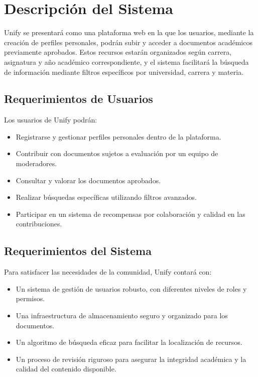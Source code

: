 \documentclass[10pt,twocolumn]{article}
\begin{document}
\section{Descripción del Sistema}
Unify se presentará como una plataforma web en la que los usuarios, mediante la creación de perfiles personales, podrán subir y acceder a documentos académicos previamente aprobados. Estos recursos estarán organizados según carrera, asignatura y año académico correspondiente, y el sistema facilitará la búsqueda de información mediante filtros específicos por universidad, carrera y materia.

\subsection{Requerimientos de Usuarios}
Los usuarios de Unify podrán:
\begin{itemize}
  \item Registrarse y gestionar perfiles personales dentro de la plataforma.
  \item Contribuir con documentos sujetos a evaluación por un equipo de moderadores.
  \item Consultar y valorar los documentos aprobados.
  \item Realizar búsquedas específicas utilizando filtros avanzados.
  \item Participar en un sistema de recompensas por colaboración y calidad en las contribuciones.
\end{itemize}

\subsection{Requerimientos del Sistema}
Para satisfacer las necesidades de la comunidad, Unify contará con:
\begin{itemize}
  \item Un sistema de gestión de usuarios robusto, con diferentes niveles de roles y permisos.
  \item Una infraestructura de almacenamiento seguro y organizado para los documentos.
  \item Un algoritmo de búsqueda eficaz para facilitar la localización de recursos.
  \item Un proceso de revisión riguroso para asegurar la integridad académica y la calidad del contenido disponible.
\end{itemize}
\end{document}
